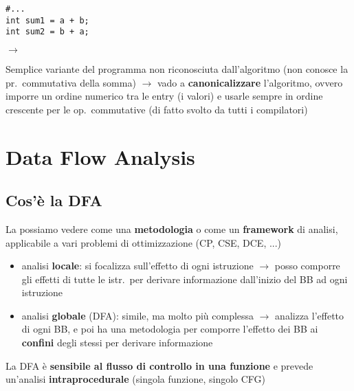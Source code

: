 \noindent\begin{minipage}[c]{.3\textwidth}
\begin{lstlisting}
#...
int sum1 = a + b;
int sum2 = b + a;\end{lstlisting}
\end{minipage}\hfill $\rightarrow$
\begin{minipage}[c]{.65\textwidth}
Semplice variante del programma non riconosciuta dall'algoritmo (non conosce la pr.~commutativa della somma) $\rightarrow$ vado a \textbf{canonicalizzare} l'algoritmo, ovvero imporre un ordine numerico tra le entry (i valori) e usarle sempre in ordine crescente per le op.~commutative (di fatto svolto da tutti i compilatori)
\end{minipage}

\section{Data Flow Analysis}

\subsection{Cos'\`e la DFA}

La possiamo vedere come una \textbf{metodologia} o come un \textbf{framework} di analisi, applicabile a vari problemi di ottimizzazione (CP, CSE, DCE, ...)

\begin{itemize}
  \item analisi \textbf{locale}: si focalizza sull'effetto di ogni istruzione $\rightarrow$ posso comporre gli effetti di tutte le istr.~per derivare informazione dall'inizio del BB ad ogni istruzione
  \item analisi \textbf{globale} (DFA): simile, ma molto pi\`u complessa $\rightarrow$ analizza l'effetto di ogni BB, e poi ha una metodologia per comporre l'effetto dei BB ai \textbf{confini} degli stessi per derivare informazione
\end{itemize}

La DFA \`e \textbf{sensibile al flusso di controllo in una funzione} e prevede un'analisi \textbf{intraprocedurale} (singola funzione, singolo CFG)


